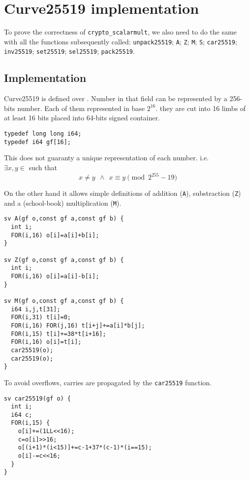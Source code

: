 \section{Curve25519 implementation}

To prove the correctness of \texttt{crypto\_scalarmult},
 we also need to do the same with all the functions subsequently called:
\texttt{unpack25519}; \texttt{A}; \texttt{Z}; \texttt{M}; \texttt{S};
\texttt{car25519}; \texttt{inv25519}; \texttt{set25519}; \texttt{sel25519};
\texttt{pack25519}.

\subsection{Implementation} \label{sec:impl}

Curve25519 is defined over \Zfield. Number in that field can
be represented by a 256-bits number. Each of them represented in base $2^{16}$.
they are cut into 16 limbs of at least 16 bits placed into 64-bits signed
container.

\begin{lstlisting}[language=Ctweetnacl]
typedef long long i64;
typedef i64 gf[16];
\end{lstlisting}
This does not guaranty a unique representation of each number. i.e.\\
$\exists x,y \in$  such that
\vspace{-0.25cm}
  $$x \neq y\ \ \land\ \ x \equiv y \pmod{2^{255}-19}$$

On the other hand it allows simple definitions of addition (\texttt{A}),
substraction (\texttt{Z}) and a (school-book) multiplication (\texttt{M}).
\begin{lstlisting}[language=Ctweetnacl]
sv A(gf o,const gf a,const gf b) {
  int i;
  FOR(i,16) o[i]=a[i]+b[i];
}

sv Z(gf o,const gf a,const gf b) {
  int i;
  FOR(i,16) o[i]=a[i]-b[i];
}

sv M(gf o,const gf a,const gf b) {
  i64 i,j,t[31];
  FOR(i,31) t[i]=0;
  FOR(i,16) FOR(j,16) t[i+j]+=a[i]*b[j];
  FOR(i,15) t[i]+=38*t[i+16];
  FOR(i,16) o[i]=t[i];
  car25519(o);
  car25519(o);
}
\end{lstlisting}

To avoid overflows, carries are propagated by the \texttt{car25519} function.
\begin{lstlisting}[language=Ctweetnacl]
sv car25519(gf o) {
  int i;
  i64 c;
  FOR(i,15) {
    o[i]+=(1LL<<16);
    c=o[i]>>16;
    o[(i+1)*(i<15)]+=c-1+37*(c-1)*(i==15);
    o[i]-=c<<16;
  }
}
\end{lstlisting}

